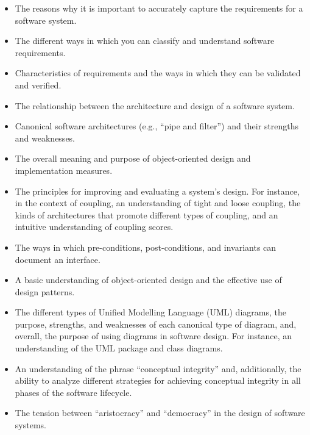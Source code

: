 \documentclass[11pt]{article}
\begin{document}
\begin{itemize}
  \item The reasons why it is important to accurately capture the requirements
    for a software system.

  \item The different ways in which you can classify and understand software
    requirements.

  \item Characteristics of requirements and the ways in which they can be
    validated and verified.

  \item The relationship between the architecture and design of a software
    system.

  \item Canonical software architectures (e.g., ``pipe and filter'') and their
    strengths and weaknesses.

  \item The overall meaning and purpose of object-oriented design and
    implementation measures.

  \item The principles for improving and evaluating a system's design. For
    instance, in the context of coupling, an understanding of tight and loose
    coupling, the kinds of architectures that promote different types of
    coupling, and an intuitive understanding of coupling scores.

  \item The ways in which pre-conditions, post-conditions, and invariants can
    document an interface.

  \item A basic understanding of object-oriented design and the effective use of
    design patterns.

  \item The different types of Unified Modelling Language (UML) diagrams, the
    purpose, strengths, and weaknesses of each canonical type of diagram, and,
    overall, the purpose of using diagrams in software design. For instance, an
    understanding of the UML package and class diagrams.

  \item An understanding of the phrase ``conceptual integrity'' and,
    additionally, the ability to analyze different strategies for achieving
    conceptual integrity in all phases of the software lifecycle.

  \item The tension between ``aristocracy'' and ``democracy'' in the design of
    software systems.


\end{itemize}
\end{document}
